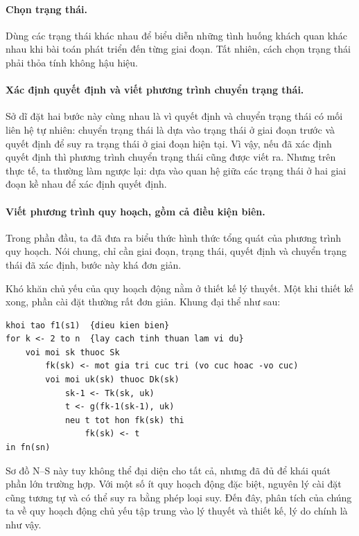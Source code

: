 \documentclass[11pt]{article}
\begin{document}
\paragraph{Chọn trạng thái.}
Dùng các trạng thái khác nhau để biểu diễn những tình huống khách quan khác
nhau khi bài toán phát triển đến từng giai đoạn. Tất nhiên, cách chọn trạng
thái phải thỏa tính không hậu hiệu.

\paragraph{Xác định quyết định và viết phương trình chuyển trạng thái.}
Sở dĩ đặt hai bước này cùng nhau là vì quyết định và chuyển trạng thái có mối
liên hệ tự nhiên: chuyển trạng thái là dựa vào trạng thái ở giai đoạn trước
và quyết định để suy ra trạng thái ở giai đoạn hiện tại. Vì vậy, nếu đã xác
định quyết định thì phương trình chuyển trạng thái cũng được viết ra. Nhưng
trên thực tế, ta thường làm ngược lại: dựa vào quan hệ giữa các trạng thái ở
hai giai đoạn kề nhau để xác định quyết định.

\paragraph{Viết phương trình quy hoạch, gồm cả điều kiện biên.}
Trong phần đầu, ta đã đưa ra biểu thức hình thức tổng quát của phương trình
quy hoạch. Nói chung, chỉ cần giai đoạn, trạng thái, quyết định và chuyển
trạng thái đã xác định, bước này khá đơn giản.

Khó khăn chủ yếu của quy hoạch động nằm ở thiết kế lý thuyết. Một khi thiết
kế xong, phần cài đặt thường rất đơn giản. Khung đại thể như sau:

\begin{verbatim}
khoi tao f1(s1)  {dieu kien bien}
for k <- 2 to n  {lay cach tinh thuan lam vi du}
    voi moi sk thuoc Sk
        fk(sk) <- mot gia tri cuc tri (vo cuc hoac -vo cuc)
        voi moi uk(sk) thuoc Dk(sk)
            sk-1 <- Tk(sk, uk)
            t <- g(fk-1(sk-1), uk)
            neu t tot hon fk(sk) thi
                fk(sk) <- t
in fn(sn)
\end{verbatim}

Sơ đồ N--S này tuy không thể đại diện cho tất cả, nhưng đã đủ để khái quát
phần lớn trường hợp. Với một số ít quy hoạch động đặc biệt, nguyên lý cài đặt
cũng tương tự và có thể suy ra bằng phép loại suy. Đến đây, phân tích của
chúng ta về quy hoạch động chủ yếu tập trung vào lý thuyết và thiết kế, lý do
chính là như vậy.
\end{document}
